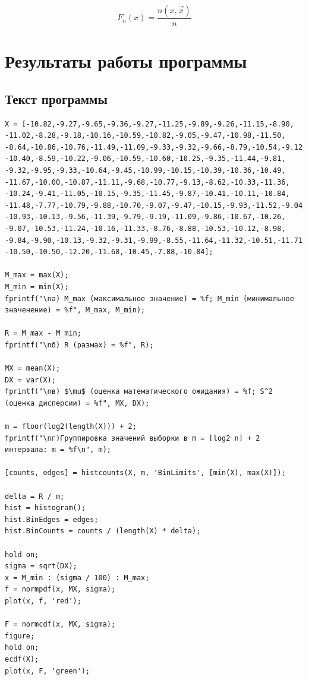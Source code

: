 \documentclass[12pt]{report}
\begin{document}
\begin{equation}
	F_n(x) = \frac{n(x, \vec x)}{n}
\end{equation}

\chapter*{Результаты работы программы}

\section*{Текст программы}
\begin{lstlisting}[mathescape]
X = [-10.82,-9.27,-9.65,-9.36,-9.27,-11.25,-9.89,-9.26,-11.15,-8.90, -11.02,-8.28,-9.18,-10.16,-10.59,-10.82,-9.05,-9.47,-10.98,-11.50,
-8.64,-10.86,-10.76,-11.49,-11.09,-9.33,-9.32,-9.66,-8.79,-10.54,-9.12,
-10.40,-8.59,-10.22,-9.06,-10.59,-10.60,-10.25,-9.35,-11.44,-9.81,
-9.32,-9.95,-9.33,-10.64,-9.45,-10.99,-10.15,-10.39,-10.36,-10.49,
-11.67,-10.00,-10.87,-11.11,-9.68,-10.77,-9.13,-8.62,-10.33,-11.36,
-10.24,-9.41,-11.05,-10.15,-9.35,-11.45,-9.87,-10.41,-10.11,-10.84,
-11.48,-7.77,-10.79,-9.88,-10.70,-9.07,-9.47,-10.15,-9.93,-11.52,-9.04,
-10.93,-10.13,-9.56,-11.39,-9.79,-9.19,-11.09,-9.86,-10.67,-10.26,
-9.07,-10.53,-11.24,-10.16,-11.33,-8.76,-8.88,-10.53,-10.12,-8.98,
-9.84,-9.90,-10.13,-9.32,-9.31,-9.99,-8.55,-11.64,-11.32,-10.51,-11.71,
-10.50,-10.50,-12.20,-11.68,-10.45,-7.88,-10.84];

M_max = max(X);
M_min = min(X);
fprintf("\nа) M_max (максимальное значение) = %f; M_min (минимальное значенение) = %f", M_max, M_min);

R = M_max - M_min;
fprintf("\nб) R (размах) = %f", R);

MX = mean(X);
DX = var(X);
fprintf("\nв) $\mu$ (оценка математического ожидания) = %f; S^2 (оценка дисперсии) = %f", MX, DX);

m = floor(log2(length(X))) + 2;
fprintf("\nг)Группировка значений выборки в m = [log2 n] + 2 интервала: m = %f\n", m);

[counts, edges] = histcounts(X, m, 'BinLimits', [min(X), max(X)]);

delta = R / m;
hist = histogram();
hist.BinEdges = edges;
hist.BinCounts = counts / (length(X) * delta);

hold on; 
sigma = sqrt(DX);
x = M_min : (sigma / 100) : M_max;
f = normpdf(x, MX, sigma);
plot(x, f, 'red');

F = normcdf(x, MX, sigma);
figure;
hold on;
ecdf(X);
plot(x, F, 'green');
\end{lstlisting}
\end{document}
